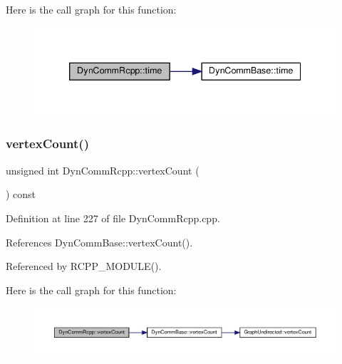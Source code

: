 Here is the call graph for this function\+:
\nopagebreak
\begin{figure}[H]
\begin{center}
\leavevmode
\includegraphics[width=339pt]{classDynCommRcpp_a89773080b66fd210a7e22234ba04a19f_cgraph}
\end{center}
\end{figure}
\mbox{\label{classDynCommRcpp_af7bc0e9dc9a2c1e232b3e28b63388629}} 
\subsubsection{\texorpdfstring{vertex\+Count()}{vertexCount()}}
{\footnotesize\ttfamily unsigned int Dyn\+Comm\+Rcpp\+::vertex\+Count (\begin{DoxyParamCaption}{ }\end{DoxyParamCaption}) const\hspace{0.3cm}{\ttfamily [inline]}}



Definition at line 227 of file Dyn\+Comm\+Rcpp.\+cpp.



References Dyn\+Comm\+Base\+::vertex\+Count().



Referenced by R\+C\+P\+P\+\_\+\+M\+O\+D\+U\+L\+E().

Here is the call graph for this function\+:
\nopagebreak
\begin{figure}[H]
\begin{center}
\leavevmode
\includegraphics[width=350pt]{classDynCommRcpp_af7bc0e9dc9a2c1e232b3e28b63388629_cgraph}
\end{center}
\end{figure}
\mbox{\label{classDynCommRcpp_ad849d8e27c9f8aec2f6cdf89b06b9be4}} 
